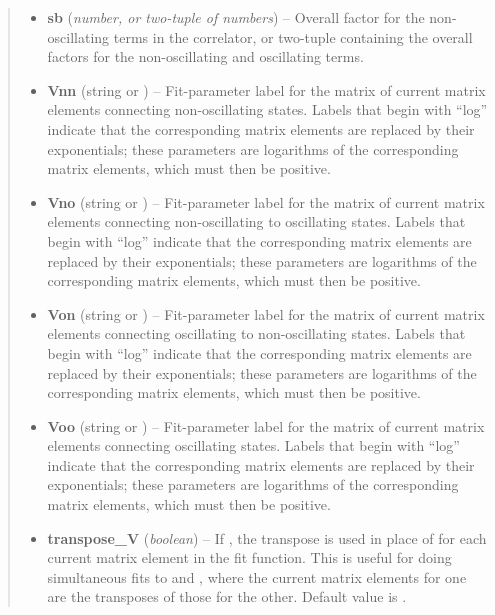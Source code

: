 \documentclass[letterpaper,10pt,english]{sphinxmanual}
\begin{document}
\begin{fulllineitems}
\begin{quote}
\begin{description}
\begin{itemize}
\item {} 
\textbf{sb} (\emph{number, or two-tuple of numbers}) -- Overall factor  for the non-oscillating  terms 
in the correlator, or two-tuple containing the overall factors
 for the non-oscillating and oscillating terms.

\item {} 
\textbf{Vnn} (string or ) -- Fit-parameter label for the matrix of current matrix 
elements  connecting non-oscillating states. Labels that
begin with ``log'' indicate that the corresponding matrix elements are
replaced by their exponentials; these parameters are logarithms of the
corresponding matrix elements, which must then be positive.

\item {} 
\textbf{Vno} (string or ) -- Fit-parameter label for the matrix of current matrix 
elements  connecting non-oscillating to oscillating
states. Labels that begin with ``log'' indicate that the corresponding
matrix elements are replaced by their exponentials; these parameters
are logarithms of the corresponding matrix elements, which must then
be positive.

\item {} 
\textbf{Von} (string or ) -- Fit-parameter label for the matrix of current matrix 
elements  connecting oscillating to non-oscillating 
states. Labels that begin with ``log'' indicate that the corresponding
matrix elements are replaced by their exponentials; these parameters
are logarithms of the corresponding matrix elements, which must then
be positive.

\item {} 
\textbf{Voo} (string or ) -- Fit-parameter label for the matrix of current matrix 
elements  connecting oscillating states. Labels that begin
with ``log'' indicate that the corresponding matrix elements are
replaced by their exponentials; these parameters are logarithms of the
corresponding matrix elements, which must then be positive.

\item {} 
\textbf{transpose\_V} (\emph{boolean}) -- If , the transpose  is used in
place of  for each current matrix element in the fit 
function. This is useful for doing simultaneous fits to 
 and , where the current matrix elements
for one are the transposes of those for the other. Default value 
is .


\end{itemize}
\end{description}
\end{quote}
\end{fulllineitems}
\end{document}
